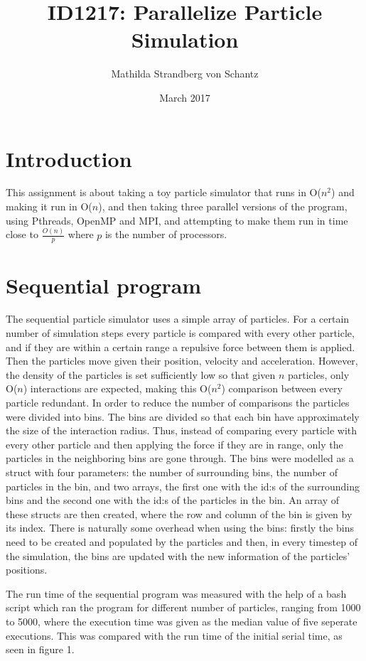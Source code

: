 \documentclass{article}
\title{ID1217: Parallelize Particle Simulation}
\author{Mathilda Strandberg von Schantz }
\date{March 2017}
\begin{document}
\maketitle

\section{Introduction}

This assignment is about taking a toy particle simulator that runs in O($n^2$) and making it run in O($n$), and then taking three parallel versions of the program, using Pthreads, OpenMP and MPI, and attempting to make them run in time close to $\frac{O(n)}{p}$ where $p$ is the number of processors.

\section{Sequential program}

The sequential particle simulator uses a simple array of particles. For a certain number of simulation steps every particle is compared with every other particle, and if they are within a certain range a repulsive force between them is applied. Then the particles move given their position, velocity and acceleration. However, the density of the particles is set sufficiently low so that given $n$ particles, only O($n$) interactions are expected, making this O($n^2$) comparison between every particle redundant. In order to reduce the number of comparisons the particles were divided into bins. The bins are divided so that each bin have approximately the size of the interaction radius.  Thus, instead of comparing every particle with every other particle and then applying the force if they are in range, only the particles in the neighboring bins are gone through. The bins were modelled as a struct with four parameters: the number of surrounding bins, the number of particles in the bin, and two arrays, the first one with the id:s of the surrounding bins and the second one with the id:s of the particles in the bin. An array of these structs are then created, where the row and column of the bin is given by its index. There is naturally some overhead when using the bins: firstly the bins need to be created and populated by the particles and then, in every timestep of the simulation, the bins are updated with the new information of the particles' positions.

The run time of the sequential program was measured with the help of a bash script which ran the program for different number of particles, ranging from 1000 to 5000, where the execution time was given as the median value of five seperate executions. This was compared with the run time of the initial serial time, as seen in figure 1.
\end{document}
